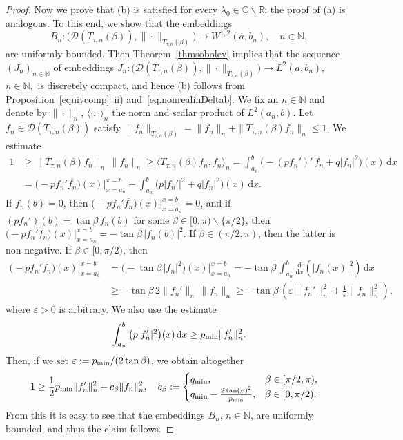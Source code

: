 \documentclass[a4paper,reqno]{amsart}
\begin{document}
\begin{proof}
Now we prove that (b) is satisfied for every $\lambda_0\in{\mathbb{C}}\backslash{\mathbb{R}}$; the proof of (a) is analogous.
To this end, we show that the embeddings $$B_n: \big({\mathcal D}(T_{\tau,n}(\beta)),\|\cdot\|_{T_{\tau,n}(\beta)}\big)\to W^{1,2}(a,b_n), \quad n\in{\mathbb{N}},$$
 are uniformly bounded. Then Theorem~\ref{thmsobolev} implies that  the sequence $(J_n)_{n\in{\mathbb{N}}}$ of embeddings $J_n:\big({\mathcal D}(T_{\tau,n}(\beta)),\|\cdot\|_{T_{\tau,n}(\beta)}\big)\to L^2(a,b_n)$, $n\in{\mathbb{N}},$ is discretely compact, and hence (b) follows from Proposition~\ref{equivcomp}~ii) and~\eqref{eq.nonrealinDeltab}.
We fix an $n\in{\mathbb{N}}$ and denote by  $\|\cdot\|_n$, $\langle\cdot,\cdot\rangle_n$ the norm and scalar product of $L^2(a_n,b)$.
Let $f_n\in{\mathcal D}(T_{\tau,n}(\beta))$ satisfy $\|f_n\|_{T_{\tau,n}(\beta)}=\|f_n\|_{n}+\|T_{\tau,n}(\beta)f_n\|_{n}\leq 1.$
We estimate
\begin{align*}
1&\geq
 \|T_{\tau,n}(\beta)f_n\|_{n}\,\|f_n\|_{n}
\geq \langle T_{\tau,n}(\beta)f_n,f_n\rangle_{n}
 =\int_{a_n}^{b} \big(-(pf_n')'\,\overline{f_n}+q|f_n|^2\big)(x)\,{\mathrm{d}} x\\
 &=\big(-pf_n'\overline{f_n}\big)(x)\Big|_{x=a_n}^{x=b}+\int_{a_n}^{b} \big(p|f_n'|^2+q|f_n|^2\big)(x)\,{\mathrm{d}} x.
 \end{align*}
 If $f_n(b)=0$, then $\big(-pf_n'\overline{f_n}\big)(x)\big|_{x=a_n}^{x=b}=0$, 
 and if  $(pf_n')(b)=\tan\beta\, f_n(b)$ for some $\beta\in[0,\pi)\backslash\{\pi/2\}$, then
 $\big(-pf_n'\overline{f_n}\big)(x)\big|_{x=a_n}^{x=b}=-\tan\beta\,|f_n(b)|^2$. If $\beta\in (\pi/2,\pi)$, then the latter is non-negative.
 If $\beta\in  [0,\pi/2)$, then
 \begin{align*}
 \big(-pf_n'\overline{f_n}\big)(x)\Big|_{x=a_n}^{x=b}
 &=\big(-\tan\beta\,|f_n|^2\big)(x)\Big|_{x=a_n}^{x=b}
 =-\tan\beta\,\int_{a_n}^{b} \frac{\mathrm{d}}{{\mathrm{d}} x}\left(|f_n(x)|^2\right)\,{\mathrm{d}} x\\
 &\geq -\tan\beta\,2\|f_n'\|_{n}\,\|f_n\|_{n}
 \geq -\tan\beta\,\left(\varepsilon \|f_n'\|_{n}^2+\frac{1}\varepsilon\|f_n\|_{n}^2\right),
 \end{align*} 
 where $\varepsilon>0$ is arbitrary.
 We also use the estimate 
 $$\int_{a_n}^b  \big(p|f_n'|^2\big)(x)\,{\mathrm{d}} x\geq p_{\rm min}\|f_n'\|_{n}^2.$$
 Then, if we set $\varepsilon:=p_{\rm min}/(2\tan\beta)$, we obtain altogether 
 \begin{align*}
 1&\geq \frac{1}{2} p_{\rm min}\|f_n'\|_{n}^2+c_{\beta}\|f_n\|_{n}^2,\quad
c_{\beta}:=
 \begin{cases}
 q_{\rm min}, & \beta\in [\pi/2,\pi),\\
 q_{\rm min}-\frac{2 \tan(\beta)^2}{p_{\rm min}}, & \beta\in [0,\pi/2).
 \end{cases}
 \end{align*}
From this it is easy to see that the embeddings $B_n$, $n\in{\mathbb{N}}$, are uniformly bounded, and thus the claim follows.
\end{proof}
\end{document}
